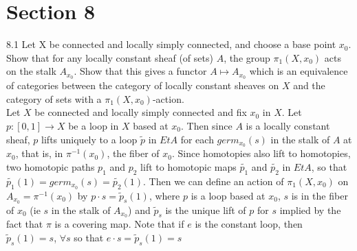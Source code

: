 \newpage
\section*{Section 8}
8.1 Let X be connected and locally simply connected, and choose a base point $x_0$. Show that for any locally constant sheaf (of sets) $A$, the group $\pi_1(X,x_0)$ acts on the stalk $A_{x_0}$. Show that this gives a functor $A \mapsto A_{x_0}$ which is an equivalence of categories between the category of locally constant sheaves on $X$ and the category of sets with a $\pi_1(X,x_0)$-action. \\

Let $X$ be connected and locally simply connected and fix $x_0$ in $X$. Let $p:[0,1] \rightarrow X$ be a loop in $X$ based at $x_0$. Then since $A$ is a locally constant sheaf, $p$ lifts uniquely to a loop $\tilde{p}$ in $EtA$ for each $germ_{x_0}(s)$ in the stalk of $A$ at $x_0$, that is, in  $\pi^{-1}(x_0)$, the fiber of $x_0$. Since homotopies also lift to homotopies, two homotopic paths $p_1$ and $p_2$ lift to homotopic maps $\tilde{p_1}$ and $\tilde{p_2}$ in $EtA$, so that $\tilde{p_1}(1)=germ_{x_0}(s)=\tilde{p_2}(1)$. Then we can define an action of $\pi_1(X,x_0)$ on $A_{x_0}=\pi^{-1}(x_0)$ by $p \cdot s = \tilde{p}_s(1)$, where $p$ is a loop based at $x_0$, $s$ is in the fiber of $x_0$ (ie $s$ in the stalk of $A_{x_0}$) and $\tilde{p}_s$ is the unique lift of $p$ for $s$ implied by the fact that $\pi$ is a covering map. Note that if $e$ is the constant loop, then $\tilde{p}_s(1) = s$, $\forall s$ so that $e \cdot s = \tilde{p}_s(1)=s$ 